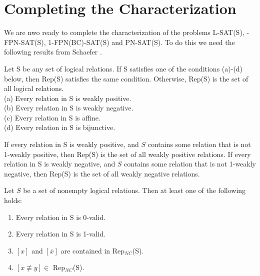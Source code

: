 \section{Completing the Characterization}\label{sec:char}

We are nwo ready to complete the characterization of the problems 
{\sf L-SAT(S)},
{-FPN-SAT(S), 1-FPN(BC)-SAT(S)} and {\sf PN-SAT(S)}. 
To do this we need the  following results from Schaefer \cite{Sc78}.


\begin{theorem}\label{th:sch3.0}
Let S 
be any set of logical relations. If S satisfies one of the conditions
(a)-(d) below, then Rep(S) satisfies the same condition. Otherwise,
Rep(S) is the set of all logical relations.\\
(a) Every relation in  S is weakly positive.\\
(b) Every relation in S is weakly negative.\\
(c) Every relation in S is affine.\\
(d) Every relation in S  is bijunctive.
\end{theorem}


\begin{theorem}\label{th:sch5.1}
If every relation in S is weakly positive, and $S$ contains some relation
that is not 1-weakly positive, then Rep(S) is the set of all weakly positive
relations.
If every relation in S is weakly negative, and $S$ contains some relation
that is not 1-weakly negative, then Rep(S) is the set of all weakly negative
relations.
\end{theorem}



\begin{lemma}\label{le:sch4.3}
Let $S$ be a set of nonempty logical relations. Then at least one of the 
following holds:
\oldspacing
\begin{enumerate}
\item
Every relation in S is 0-valid.
\item
Every relation in S is 1-valid.
\item
$[x]$ and $[\overline{x}]$ are contained in Rep$_{NC}$(S).

\item
$[x \not\equiv y] \in$ Rep$_{NC}$(S).
\end{enumerate}
\end{lemma}




